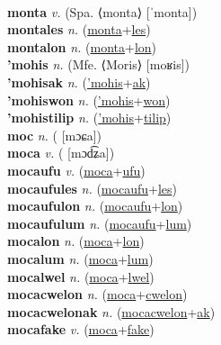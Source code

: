  \label{'monkoltilip} \\
\textbf{monta} \textit{v.} (Spa. ⟨monta⟩ [ˈmonta])
 \label{monta} \\
\textbf{montales} \textit{n.} (\hyperref[monta]{monta}+\hyperref[les]{les})
 \label{montales} \\
\textbf{montalon} \textit{n.} (\hyperref[monta]{monta}+\hyperref[lon]{lon})
 \label{montalon} \\
\textbf{'mohis} \textit{n.} (Mfe. ⟨Moris⟩ [moʁis])
 \label{'mohis} \\
\textbf{'mohisak} \textit{n.} (\hyperref['mohis]{'mohis}+\hyperref[ak]{ak})
 \label{'mohisak} \\
\textbf{'mohiswon} \textit{n.} (\hyperref['mohis]{'mohis}+\hyperref[won]{won})
 \label{'mohiswon} \\
\textbf{'mohistilip} \textit{n.} (\hyperref['mohis]{'mohis}+\hyperref[tilip]{tilip})
 \label{'mohistilip} \\
\textbf{moc} \textit{n.} ( [mɔɕa])
 \label{moc} \\
\textbf{moca} \textit{v.} ( [mɔd͡ʑa])
 \label{moca} \\
\textbf{mocaufu} \textit{v.} (\hyperref[moca]{moca}+\hyperref[ufu]{ufu})
 \label{mocaufu} \\
\textbf{mocaufules} \textit{n.} (\hyperref[mocaufu]{mocaufu}+\hyperref[les]{les})
 \label{mocaufules} \\
\textbf{mocaufulon} \textit{n.} (\hyperref[mocaufu]{mocaufu}+\hyperref[lon]{lon})
 \label{mocaufulon} \\
\textbf{mocaufulum} \textit{n.} (\hyperref[mocaufu]{mocaufu}+\hyperref[lum]{lum})
 \label{mocaufulum} \\
\textbf{mocalon} \textit{n.} (\hyperref[moca]{moca}+\hyperref[lon]{lon})
 \label{mocalon} \\
\textbf{mocalum} \textit{n.} (\hyperref[moca]{moca}+\hyperref[lum]{lum})
 \label{mocalum} \\
\textbf{mocalwel} \textit{n.} (\hyperref[moca]{moca}+\hyperref[lwel]{lwel})
 \label{mocalwel} \\
\textbf{mocacwelon} \textit{n.} (\hyperref[moca]{moca}+\hyperref[cwelon]{cwelon})
 \label{mocacwelon} \\
\textbf{mocacwelonak} \textit{n.} (\hyperref[mocacwelon]{mocacwelon}+\hyperref[ak]{ak})
 \label{mocacwelonak} \\
\textbf{mocafake} \textit{v.} (\hyperref[moca]{moca}+\hyperref[fake]{fake})
 \label{mocafake} \\
